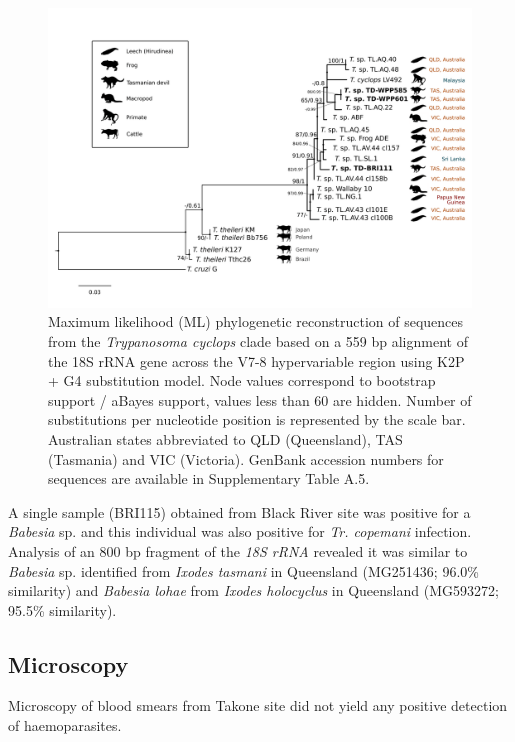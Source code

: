 \documentclass[a4paper, nobind]{templates/ociamthesis}
\begin{document}
\begin{figure}
\includegraphics[width=0.95\linewidth]{figures/ms-figs/Ch6-Fig4} \caption[Phylogenetic tree of \textit{Tr. cyclops} clade (\textit{18S rRNA}, v7-8 region) from the Tasmanian devil.]{Maximum likelihood (ML) phylogenetic reconstruction of sequences from the \textit{Trypanosoma cyclops} clade based on a 559 bp alignment of the 18S rRNA gene across the V7-8 hypervariable region using K2P + G4 substitution model. Node values correspond to bootstrap support / aBayes support, values less than 60 are hidden. Number of substitutions per nucleotide position is represented by the scale bar. Australian states abbreviated to QLD (Queensland), TAS (Tasmania) and VIC (Victoria). GenBank accession numbers for sequences are available in Supplementary Table A.5.}\label{fig:F64}
\end{figure}

A single sample (BRI115) obtained from Black River site was positive for a \emph{Babesia} sp. and this individual was also positive for \emph{Tr. copemani} infection. Analysis of an 800 bp fragment of the \emph{18S rRNA} revealed it was similar to \emph{Babesia} sp. identified from \emph{Ixodes tasmani} in Queensland (MG251436; 96.0\% similarity) and \emph{Babesia lohae} from \emph{Ixodes holocyclus} in Queensland (MG593272; 95.5\% similarity).

\hypertarget{microscopy}{%
\subsection{Microscopy}\label{microscopy}}

Microscopy of blood smears from Takone site did not yield any positive detection of haemoparasites.
\end{document}
